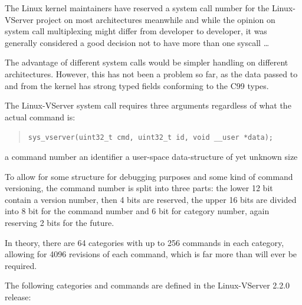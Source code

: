 The Linux kernel maintainers have reserved a system call number for the
Linux-VServer project on most architectures meanwhile  and while the opinion on
system call multiplexing might differ from developer to developer, it was
generally considered a good decision not to have more than one syscall \ldots

The advantage of different system calls would be simpler handling on different
architectures. However, this has not been a problem so far, as the data passed
to and from the kernel has strong typed fields conforming to the C99 types.

The Linux-VServer system call requires three arguments regardless of what the
actual command is:

\begin{quote}
\texttt{sys\_vserver(uint32\_t cmd, uint32\_t id, void \_\_user *data);}
\end{quote}

\begin{labeling}{}
  a command number
   an identifier
 a user-space data-structure of yet unknown size
\end{labeling}

To allow for some structure for debugging purposes and some kind of command
versioning, the command number is split into three parts: the lower 12 bit
contain a version number, then 4 bits are reserved, the upper 16 bits are
divided into 8 bit for the command number and 6 bit for category number, again
reserving 2 bits for the future.

In theory, there are 64 categories with up to 256 commands in each category,
allowing for 4096 revisions of each command, which is far more than will ever be
required.

The following categories and commands are defined in the Linux-VServer 2.2.0
release:

